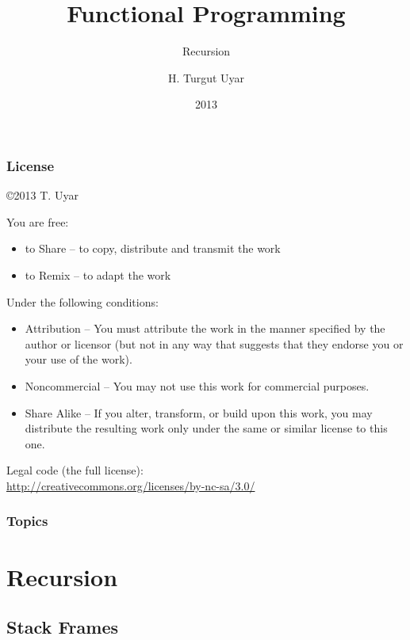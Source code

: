 \documentclass[dvipsnames]{beamer}
\title{Functional Programming}
\subtitle{Recursion}
\author{H. Turgut Uyar}
\date{2013}
\theoremstyle{plain}
\begin{document}
\begin{frame}
  \titlepage
\end{frame}

\begin{frame}
  \frametitle{License}

  \hfill
  \copyright 2013 T. Uyar

  \vfill
  \begin{tiny}
    You are free:
    \begin{itemize}
      \item to Share -- to copy, distribute and transmit the work
      \item to Remix -- to adapt the work
    \end{itemize}

    Under the following conditions:
    \begin{itemize}
      \item Attribution -- You must attribute the work in the manner specified by
        the author or licensor (but not in any way that suggests that they
        endorse you or your use of the work).

      \item Noncommercial -- You may not use this work for commercial purposes.

      \item Share Alike -- If you alter, transform, or build upon this work, you
        may distribute the resulting work only under the same or similar license
        to this one.
    \end{itemize}
  \end{tiny}

  \vfill
  Legal code (the full license):\\
  \url{http://creativecommons.org/licenses/by-nc-sa/3.0/}
\end{frame}

\begin{frame}
  \frametitle{Topics}
  \tableofcontents
\end{frame}

\section{Recursion}

\subsection{Stack Frames}
\end{document}
